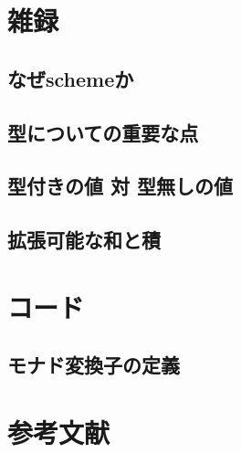 \documentclass[11pt, oneside]{jsarticle}   	%
\begin{document}
\newpage
\renewcommand{\thesection}{\Alph{section}}
\renewcommand{\thesubsection}{\thesection-\arabic{subsection}}
\setcounter{section}{0}

\section{ 雑録 }
\subsection{ なぜschemeか }
\subsection{ 型についての重要な点 }
\subsection{ 型付きの値 対 型無しの値 }
\subsection{ 拡張可能な和と積 }

\newpage
\section{コード}
\subsection{ モナド変換子の定義 }
\newpage

\newpage

\newpage

\newpage

\newpage

\newpage

\newpage

\newpage

\newpage






\section{参考文献}
\end{document}
